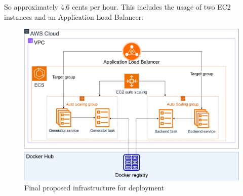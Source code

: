 		So approximately 4.6 cents per hour. This includes the usage of two EC2 instances and an Application Load Balancer.

		\begin{figure}[h!]
			\begin{center}
				\includegraphics[scale=0.35]{include/imgs/aws_infra_plan.png}
				\caption{Final proposed infrastructure for deployment}
				\label{infraplan}
			\end{center}
		\end{figure}